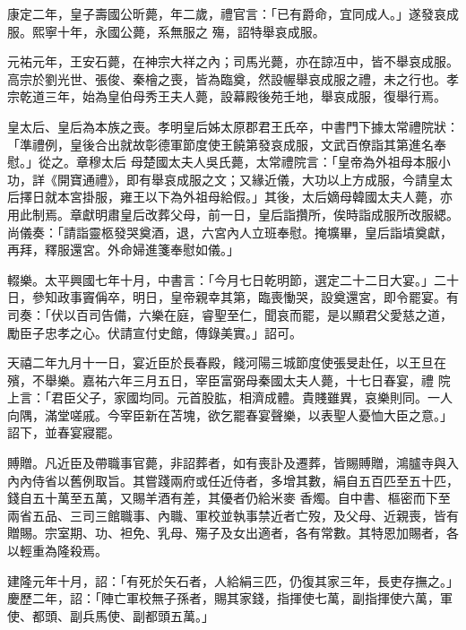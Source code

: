 \begin{pinyinscope}
 康定二年，皇子壽國公昕薨，年二歲，禮官言：「已有爵命，宜同成人。」遂發哀成服。熙寧十年，永國公薨，系無服之
 殤，詔特舉哀成服。



 元祐元年，王安石薨，在神宗大祥之內；司馬光薨，亦在諒冱中，皆不舉哀成服。高宗於劉光世、張俊、秦檜之喪，皆為臨奠，然設幄舉哀成服之禮，未之行也。孝宗乾道三年，始為皇伯母秀王夫人薨，設幕殿後苑壬地，舉哀成服，復舉行焉。



 皇太后、皇后為本族之喪。孝明皇后姊太原郡君王氏卒，中書門下據太常禮院狀：「準禮例，皇後合出就故彰德軍節度使王饒第發哀成服，文武百僚詣其第進名奉慰。」從之。章穆太后
 母楚國太夫人吳氏薨，太常禮院言：「皇帝為外祖母本服小功，詳《開寶通禮》，即有舉哀成服之文；又緣近儀，大功以上方成服，今請皇太后擇日就本宮掛服，雍王以下為外祖母給假。」其後，太后嫡母韓國太夫人薨，亦用此制焉。章獻明肅皇后改葬父母，前一日，皇后詣攢所，俟時詣成服所改服緦。尚儀奏：「請詣靈柩發哭奠酒，退，六宮內人立班奉慰。掩壙畢，皇后詣墳奠獻，再拜，釋服還宮。外命婦進箋奉慰如儀。」



 輟樂。太平興國七年十月，中書言：「今月七日乾明節，選定二十二日大宴。」二十日，參知政事竇偁卒，明日，皇帝親幸其第，臨喪慟哭，設奠還宮，即令罷宴。有司奏：「伏以百司告備，六樂在庭，睿聖至仁，聞哀而罷，是以顯君父愛慈之道，勵臣子忠孝之心。伏請宣付史館，傳錄美實。」詔可。



 天禧二年九月十一日，宴近臣於長春殿，餞河陽三城節度使張旻赴任，以王旦在殯，不舉樂。嘉祐六年三月五日，宰臣富弼母秦國太夫人薨，十七日春宴，禮
 院上言：「君臣父子，家國均同。元首股肱，相濟成體。貴賤雖異，哀樂則同。一人向隅，滿堂嗟戚。今宰臣新在苫塊，欲乞罷春宴聲樂，以表聖人憂恤大臣之意。」詔下，並春宴寢罷。



 賻贈。凡近臣及帶職事官薨，非詔葬者，如有喪訃及遷葬，皆賜賻贈，鴻臚寺與入內內侍省以舊例取旨。其嘗踐兩府或任近侍者，多增其數，絹自五百匹至五十匹，錢自五十萬至五萬，又賜羊酒有差，其優者仍給米麥
 香燭。自中書、樞密而下至兩省五品、三司三館職事、內職、軍校並執事禁近者亡歿，及父母、近親喪，皆有贈賜。宗室期、功、袒免、乳母、殤子及女出適者，各有常數。其特恩加賜者，各以輕重為隆殺焉。



 建隆元年十月，詔：「有死於矢石者，人給絹三匹，仍復其家三年，長吏存撫之。」慶歷二年，詔：「陣亡軍校無子孫者，賜其家錢，指揮使七萬，副指揮使六萬，軍使、都頭、副兵馬使、副都頭五萬。」




\end{pinyinscope}
